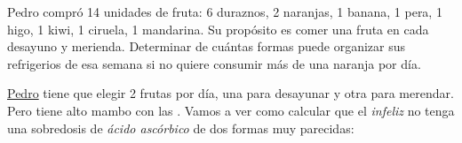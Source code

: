\def\Pedro{\href{https://www.youtube.com/watch?v=RXKabdUBiWM}{Pedro}\xspace}
\def\limon{\orange{\faIcon{lemon}}}

\begin{enunciado}{\ejercicio}
  Pedro compró 14 unidades de fruta: 6 duraznos, 2 naranjas, 1 banana, 1 pera, 1 higo, 1 kiwi, 1 ciruela, 1 mandarina.
  Su propósito es comer una fruta en cada desayuno y merienda. Determinar de cuántas formas puede organizar sus refrigerios de
  esa semana si no quiere consumir más de una naranja por día.
\end{enunciado}

\Pedro tiene que elegir 2 frutas por día, una para desayunar y otra para merendar.
Pero tiene alto mambo con las . Vamos a ver como calcular que el \textit{infeliz} no tenga una sobredosis de
\textit{ácido ascórbico} de dos formas muy parecidas:

